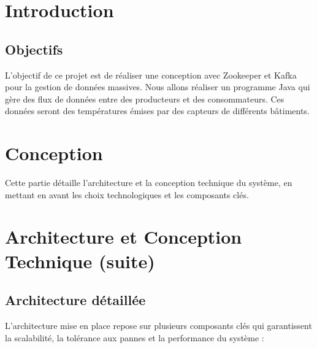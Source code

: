 \section{Introduction}

\subsection{Objectifs}

L'objectif de ce projet est de réaliser une conception avec Zookeeper et Kafka pour la gestion de données massives.
Nous allons réaliser un programme Java qui gère des flux de données entre des producteurs et des consommateurs.
Ces données seront des températures émises par des capteurs de différents bâtiments.


\section{Conception}

Cette partie détaille l’architecture et la conception technique du système, en mettant en avant les choix technologiques et les composants clés.


\section{Architecture et Conception Technique (suite)}

\subsection{Architecture détaillée}

L’architecture mise en place repose sur plusieurs composants clés qui garantissent la scalabilité, la tolérance aux pannes et la performance du système :


